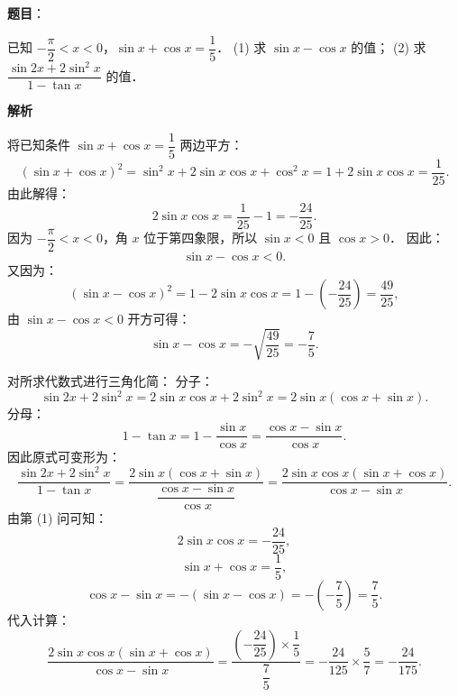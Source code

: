 \begin{answer}

\textbf{题目}：

已知 $-\dfrac{\pi}{2} < x < 0$，$\sin x + \cos x = \dfrac{1}{5}$．
(1) 求 $\sin x - \cos x$ 的值；
(2) 求 $\dfrac{\sin 2x + 2\sin^2 x}{1 - \tan x}$ 的值．

\textbf{解析}


将已知条件 $\sin x + \cos x = \dfrac{1}{5}$ 两边平方：
\nopagebreak[4]
\[
(\sin x + \cos x)^2 = \sin^2 x + 2\sin x\cos x + \cos^2 x = 1 + 2\sin x\cos x = \frac{1}{25}.
\]
由此解得：
\nopagebreak[4]
\[
2\sin x\cos x = \frac{1}{25} - 1 = -\frac{24}{25}.
\]
因为 $-\dfrac{\pi}{2} < x < 0$，角 $x$ 位于第四象限，所以 $\sin x < 0$ 且 $\cos x > 0$．
因此：
\nopagebreak[4]
\[
\sin x - \cos x < 0.
\]
又因为：
\nopagebreak[4]
\[
(\sin x - \cos x)^2 = 1 - 2\sin x\cos x = 1 - \left(-\frac{24}{25}\right) = \frac{49}{25},
\]
由 $\sin x - \cos x < 0$ 开方可得：
\nopagebreak[4]
\[
\sin x - \cos x = -\sqrt{\frac{49}{25}} = -\frac{7}{5}.
\]


对所求代数式进行三角化简：
分子：
\nopagebreak[4]
\[
\sin 2x + 2\sin^2 x = 2\sin x\cos x + 2\sin^2 x = 2\sin x(\cos x + \sin x).
\]
分母：
\nopagebreak[4]
\[
1 - \tan x = 1 - \frac{\sin x}{\cos x} = \frac{\cos x - \sin x}{\cos x}.
\]
因此原式可变形为：
\nopagebreak[4]
\[
\frac{\sin 2x + 2\sin^2 x}{1 - \tan x} = \frac{2\sin x(\cos x + \sin x)}{\dfrac{\cos x - \sin x}{\cos x}} = \frac{2\sin x\cos x(\sin x + \cos x)}{\cos x - \sin x}.
\]
由第 (1) 问可知：
\nopagebreak[4]
\[
2\sin x\cos x = -\frac{24}{25},
\]
\nopagebreak[4]
\[
\sin x + \cos x = \frac{1}{5},
\]
\nopagebreak[4]
\[
\cos x - \sin x = -(\sin x - \cos x) = -\left(-\frac{7}{5}\right) = \frac{7}{5}.
\]
代入计算：
\nopagebreak[4]
\[
\frac{2\sin x\cos x(\sin x + \cos x)}{\cos x - \sin x} = \frac{\left(-\dfrac{24}{25}\right) \times \dfrac{1}{5}}{\dfrac{7}{5}} = -\frac{24}{125} \times \frac{5}{7} = -\frac{24}{175}.
\]



\end{answer}
